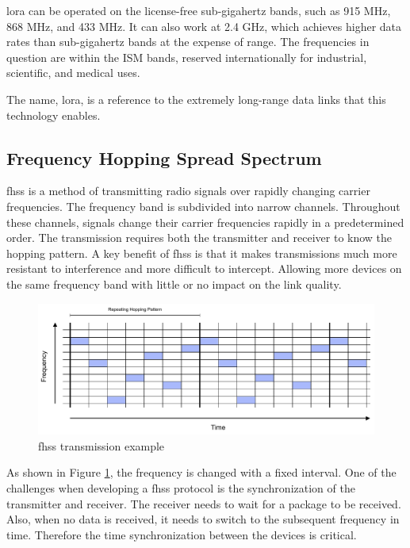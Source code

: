 \acrshort{lora} can be operated on the license-free sub-gigahertz bands, such as 915 MHz, 868 MHz, and 433 MHz. It can also work at 2.4 GHz, which achieves higher data rates than sub-gigahertz bands at the expense of range. The frequencies in question are within the ISM bands, reserved internationally for industrial, scientific, and medical uses. \cite{ism-wiki}

The name, \acrshort{lora}, is a reference to the extremely long-range data links that this technology enables. 

\newpage

\subsection{Frequency Hopping Spread Spectrum}
\acrfull{fhss} is a method of transmitting radio signals over rapidly changing carrier frequencies. The frequency band is subdivided into narrow channels. Throughout these channels, signals change their carrier frequencies rapidly in a predetermined order. The transmission requires both the transmitter and receiver to know the hopping pattern. A key benefit of \acrshort{fhss} is that it makes transmissions much more resistant to interference and more difficult to intercept. Allowing more devices on the same frequency band with little or no impact on the link quality.\cite{fhss-wiki}

\begin{figure}[h!]
	\centering
	\includegraphics[width=\textwidth]{images/fhss}
	\caption{\acrshort{fhss} transmission example}
	\label{fig:fhss}
\end{figure}

As shown in Figure \ref{fig:fhss}, the frequency is changed with a fixed interval. One of the challenges when developing a \acrshort{fhss} protocol is the synchronization of the transmitter and receiver. The receiver needs to wait for a package to be received. Also, when no data is received, it needs to switch to the subsequent frequency in time. Therefore the time synchronization between the devices is critical. 
\newpage

